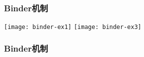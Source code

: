 \begin{frame}[plain]
	\frametitle{Binder机制}
	\centering
	
\texttt{[image: binder-ex1]}
\texttt{[image: binder-ex3]}
	
\end{frame}
\begin{frame}[fragile]
	\frametitle{Binder机制}
%	
%			
%			
\end{frame}

